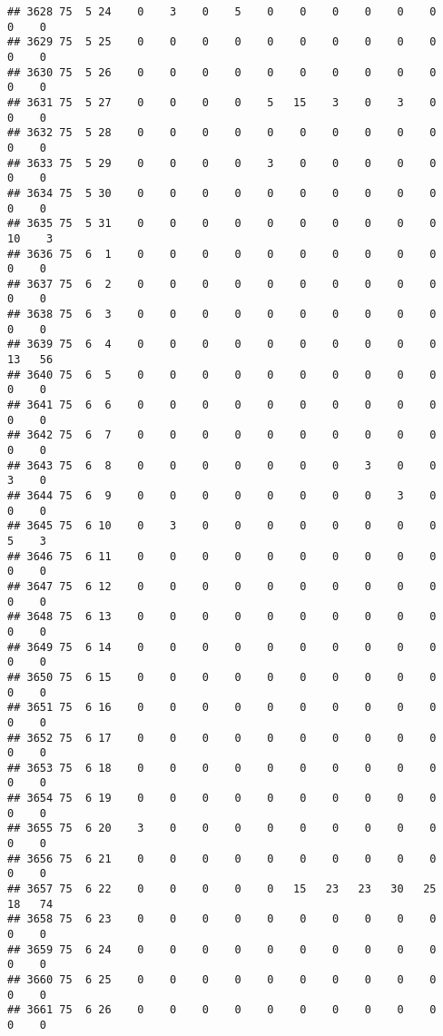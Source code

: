 \documentclass[]{article}
\begin{document}
\begin{verbatim}
## 3628 75  5 24    0    3    0    5    0    0    0    0    0    0    0    0
## 3629 75  5 25    0    0    0    0    0    0    0    0    0    0    0    0
## 3630 75  5 26    0    0    0    0    0    0    0    0    0    0    0    0
## 3631 75  5 27    0    0    0    0    5   15    3    0    3    0    0    0
## 3632 75  5 28    0    0    0    0    0    0    0    0    0    0    0    0
## 3633 75  5 29    0    0    0    0    3    0    0    0    0    0    0    0
## 3634 75  5 30    0    0    0    0    0    0    0    0    0    0    0    0
## 3635 75  5 31    0    0    0    0    0    0    0    0    0    0   10    3
## 3636 75  6  1    0    0    0    0    0    0    0    0    0    0    0    0
## 3637 75  6  2    0    0    0    0    0    0    0    0    0    0    0    0
## 3638 75  6  3    0    0    0    0    0    0    0    0    0    0    0    0
## 3639 75  6  4    0    0    0    0    0    0    0    0    0    0   13   56
## 3640 75  6  5    0    0    0    0    0    0    0    0    0    0    0    0
## 3641 75  6  6    0    0    0    0    0    0    0    0    0    0    0    0
## 3642 75  6  7    0    0    0    0    0    0    0    0    0    0    0    0
## 3643 75  6  8    0    0    0    0    0    0    0    3    0    0    3    0
## 3644 75  6  9    0    0    0    0    0    0    0    0    3    0    0    0
## 3645 75  6 10    0    3    0    0    0    0    0    0    0    0    5    3
## 3646 75  6 11    0    0    0    0    0    0    0    0    0    0    0    0
## 3647 75  6 12    0    0    0    0    0    0    0    0    0    0    0    0
## 3648 75  6 13    0    0    0    0    0    0    0    0    0    0    0    0
## 3649 75  6 14    0    0    0    0    0    0    0    0    0    0    0    0
## 3650 75  6 15    0    0    0    0    0    0    0    0    0    0    0    0
## 3651 75  6 16    0    0    0    0    0    0    0    0    0    0    0    0
## 3652 75  6 17    0    0    0    0    0    0    0    0    0    0    0    0
## 3653 75  6 18    0    0    0    0    0    0    0    0    0    0    0    0
## 3654 75  6 19    0    0    0    0    0    0    0    0    0    0    0    0
## 3655 75  6 20    3    0    0    0    0    0    0    0    0    0    0    0
## 3656 75  6 21    0    0    0    0    0    0    0    0    0    0    0    0
## 3657 75  6 22    0    0    0    0    0   15   23   23   30   25   18   74
## 3658 75  6 23    0    0    0    0    0    0    0    0    0    0    0    0
## 3659 75  6 24    0    0    0    0    0    0    0    0    0    0    0    0
## 3660 75  6 25    0    0    0    0    0    0    0    0    0    0    0    0
## 3661 75  6 26    0    0    0    0    0    0    0    0    0    0    0    0

\end{verbatim}
\end{document}
